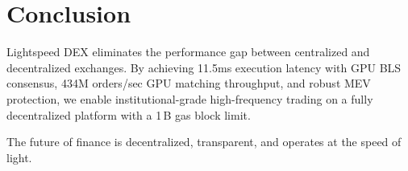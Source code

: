 \section{Conclusion}


Lightspeed DEX eliminates the performance gap between centralized and decentralized exchanges. By achieving 11.5ms execution latency with GPU BLS consensus, 434M orders/sec GPU matching throughput, and robust MEV protection, we enable institutional-grade high-frequency trading on a fully decentralized platform with a 1\,B gas block limit.

The future of finance is decentralized, transparent, and operates at the speed of light.

